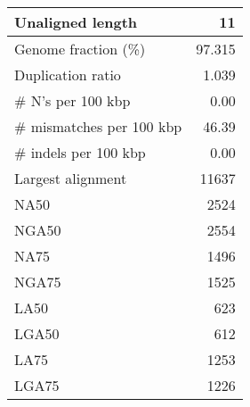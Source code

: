 \documentclass[12pt,a4paper]{article}
\begin{document}
\begin{table}[ht]
\begin{center}
\begin{tabular}{|l*{1}{|r}|}
Unaligned length & 11 \\ \hline
Genome fraction (\%) & 97.315 \\ \hline
Duplication ratio & 1.039 \\ \hline
\# N's per 100 kbp & 0.00 \\ \hline
\# mismatches per 100 kbp & 46.39 \\ \hline
\# indels per 100 kbp & 0.00 \\ \hline
Largest alignment & 11637 \\ \hline
NA50 & 2524 \\ \hline
NGA50 & 2554 \\ \hline
NA75 & 1496 \\ \hline
NGA75 & 1525 \\ \hline
LA50 & 623 \\ \hline
LGA50 & 612 \\ \hline
LA75 & 1253 \\ \hline
LGA75 & 1226 \\ \hline
\end{tabular}
\end{center}
\end{table}
\end{document}
